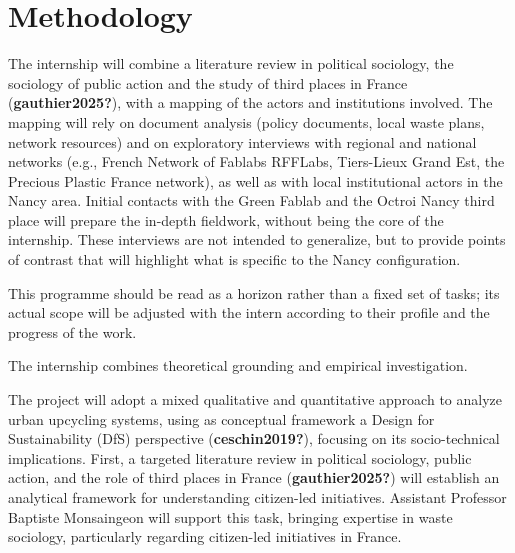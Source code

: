 \documentclass[
  12pt,
  openany]{book}
\begin{document}
\chapter{Methodology}\label{methodology}

The internship will combine a literature review in political sociology,
the sociology of public action and the study of third places in France
(\textbf{gauthier2025?}), with a mapping of the actors and institutions
involved. The mapping will rely on document analysis (policy documents,
local waste plans, network resources) and on exploratory interviews with
regional and national networks (e.g., French Network of Fablabs RFFLabs,
Tiers-Lieux Grand Est, the Precious Plastic France network), as well as
with local institutional actors in the Nancy area. Initial contacts with
the Green Fablab and the Octroi Nancy third place will prepare the
in-depth fieldwork, without being the core of the internship. These
interviews are not intended to generalize, but to provide points of
contrast that will highlight what is specific to the Nancy
configuration.

\begin{tcolorbox}[enhanced jigsaw, arc=.35mm, bottomrule=.15mm, bottomtitle=1mm, breakable, colback=white, colbacktitle=quarto-callout-note-color!10!white, colframe=quarto-callout-note-color-frame, coltitle=black, left=2mm, leftrule=.75mm, opacityback=0, opacitybacktitle=0.6, rightrule=.15mm, title=\textcolor{quarto-callout-note-color}{\faInfo}\hspace{0.5em}{Note on scope}, titlerule=0mm, toprule=.15mm, toptitle=1mm]

This programme should be read as a horizon rather than a fixed set of
tasks; its actual scope will be adjusted with the intern according to
their profile and the progress of the work.

\end{tcolorbox}

The internship combines theoretical grounding and empirical
investigation.

The project will adopt a mixed qualitative and quantitative approach to
analyze urban upcycling systems, using as conceptual framework a Design
for Sustainability (DfS) perspective (\textbf{ceschin2019?}), focusing
on its socio-technical implications. First, a targeted literature review
in political sociology, public action, and the role of third places in
France (\textbf{gauthier2025?}) will establish an analytical framework
for understanding citizen-led initiatives. Assistant Professor Baptiste
Monsaingeon will support this task, bringing expertise in waste
sociology, particularly regarding citizen-led initiatives in France.
\end{document}
